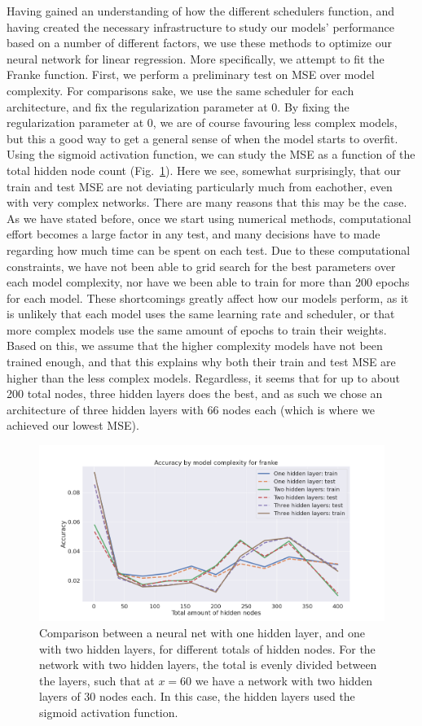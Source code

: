 \documentclass[onecolumn,10pt,cleanfoot]{asme2ej}
\begin{document}
Having gained an understanding of how the different schedulers function, and having created the necessary infrastructure to study our models' performance based on a number of different factors, we use these methods to optimize our neural network for linear regression. More specifically, we attempt to fit the Franke function. First, we perform a preliminary test on MSE over model complexity. For comparisons sake, we use the same scheduler for each architecture, and fix the regularization parameter at 0. By fixing the regularization parameter at 0, we are of course favouring less complex models, but this a good way to get a general sense of when the model starts to overfit. Using the sigmoid activation function, we can study the MSE as a function of the total hidden node count (Fig.~\ref{msebymodelfranke}). Here we see, somewhat surprisingly, that our train and test MSE are not deviating particularly much from eachother, even with very complex networks. There are many reasons that this may be the case. As we have stated before, once we start using numerical methods, computational effort becomes a large factor in any test, and many decisions have to made regarding how much time can be spent on each test. Due to these computational constraints, we have not been able to grid search for the best parameters over each model complexity, nor have we been able to train for more than 200 epochs for each model. These shortcomings greatly affect how our models perform, as it is unlikely that each model uses the same learning rate and scheduler, or that more complex models use the same amount of epochs to train their weights. Based on this, we assume that the higher complexity models have not been trained enough, and that this explains why both their train and test MSE are higher than the less complex models. Regardless, it seems that for up to about 200 total nodes, three hidden layers does the best, and as such we chose an architecture of three hidden layers with 66 nodes each (which is where we achieved our lowest MSE).

\begin{figure}[H]
\centerline{\includegraphics[width=6in]{figure/msebymodelfranke.png}}
\caption{Comparison between a neural net with one hidden layer, and one with two hidden layers, for different totals of hidden nodes. For the network with two hidden layers, the total is evenly divided between the layers, such that at $x = 60$ we have a network with two hidden layers of 30 nodes each. In this case, the hidden layers used the sigmoid activation function.}
\label{msebymodelfranke}
\end{figure}
\end{document}
